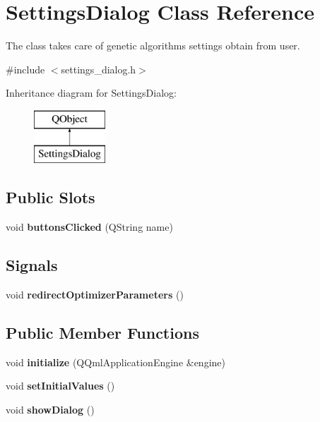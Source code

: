 \hypertarget{class_settings_dialog}{}\section{Settings\+Dialog Class Reference}
\label{class_settings_dialog}


The class takes care of genetic algorithm\textquotesingle{}s settings obtain from user.  




{\ttfamily \#include $<$settings\+\_\+dialog.\+h$>$}

Inheritance diagram for Settings\+Dialog\+:\begin{figure}[H]
\begin{center}
\leavevmode
\includegraphics[height=2.000000cm]{class_settings_dialog}
\end{center}
\end{figure}
\subsection*{Public Slots}
\begin{DoxyCompactItemize}
\item 
\hypertarget{class_settings_dialog_a39b1536560a0eeb6fab732deee884f6d}{}\label{class_settings_dialog_a39b1536560a0eeb6fab732deee884f6d} 
void {\bfseries buttons\+Clicked} (Q\+String name)
\end{DoxyCompactItemize}
\subsection*{Signals}
\begin{DoxyCompactItemize}
\item 
\hypertarget{class_settings_dialog_a324625fc61d22dc18cc7f1ba15ebdb9a}{}\label{class_settings_dialog_a324625fc61d22dc18cc7f1ba15ebdb9a} 
void {\bfseries redirect\+Optimizer\+Parameters} ()
\end{DoxyCompactItemize}
\subsection*{Public Member Functions}
\begin{DoxyCompactItemize}
\item 
\hypertarget{class_settings_dialog_acf8060ba9a873b7c6b1ccdd167fc6ef8}{}\label{class_settings_dialog_acf8060ba9a873b7c6b1ccdd167fc6ef8} 
void {\bfseries initialize} (Q\+Qml\+Application\+Engine \&engine)
\item 
\hypertarget{class_settings_dialog_a465e5688dc43f0f9759ba61205bf6652}{}\label{class_settings_dialog_a465e5688dc43f0f9759ba61205bf6652} 
void {\bfseries set\+Initial\+Values} ()
\item 
\hypertarget{class_settings_dialog_a2d836b1750f32ceaa0c545fbdad33f16}{}\label{class_settings_dialog_a2d836b1750f32ceaa0c545fbdad33f16} 
void {\bfseries show\+Dialog} ()
\end{DoxyCompactItemize}


